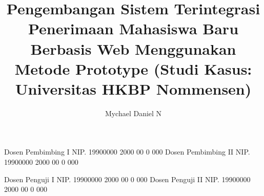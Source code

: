 \documentclass[article]{report} %
\begin{document}
    
    \title{Pengembangan Sistem Terintegrasi Penerimaan Mahasiswa Baru Berbasis Web Menggunakan Metode Prototype (Studi Kasus: Universitas HKBP Nommensen)}
    
	\author{Mychael Daniel N}		%
	
	\dosbingA%
		{Dosen Pembimbing I}%
		{NIP. 19900000 2000 00 0 000}	%
	\dosbingB%
		{Dosen Pembimbing II}%
		{NIP. 19900000 2000 00 0 000}	%
		
	\pengujiA%
		{Dosen Penguji I}%
		{NIP. 19900000 2000 00 0 000}	%
	\pengujiB%
		{Dosen Penguji II}%
		{NIP. 19900000 2000 00 0 000}	%

	\sloppy %
    \setcounter{page}{1} %
\end{document}
